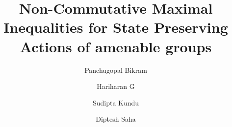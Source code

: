 \documentclass[11pt]{amsart}
\theoremstyle{definition}
\theoremstyle{myremark}
\numberwithin{equation}{section}
\begin{document}
	
	\title[Maximal Ergodic Inequalities]{ Non-Commutative Maximal Inequalities  for State Preserving Actions of amenable groups }
	
	\author[P. Bikram]{Panchugopal Bikram}
	\address{School of Mathematical Sciences,
National Institute of Science Education and Research,  Bhubaneswar, An OCC of Homi Bhabha National Institute,  Jatni- 752050, India}


\author[Hariharan G]{Hariharan G}
	\address{School of Mathematical Sciences,
National Institute of Science Education and Research,  Bhubaneswar, An OCC of Homi Bhabha National Institute,  Jatni- 752050, India}

\author[S. Kundu]{Sudipta Kundu}
	\address{School of Mathematical Sciences,
National Institute of Science Education and Research,  Bhubaneswar, An OCC of Homi Bhabha National Institute,  Jatni- 752050, India}
    
	
	
	\author[D. Saha]{Diptesh Saha}
	\address{Institute of Mathematics of the Polish Academy of Sciences,  ul. Sniadeckich 8, 
		00–656 Warszawa, Poland}
	
	
	
	
	
	
	
	
\end{document}
